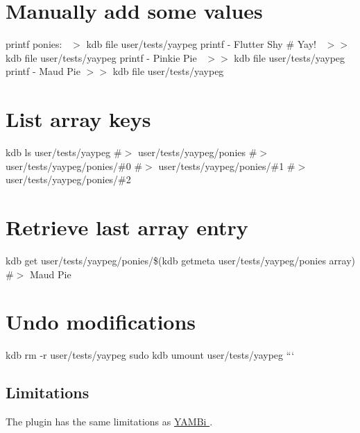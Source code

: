 \section*{Manually add some values}

printf \textquotesingle{}ponies\+:~\newline
\textquotesingle{} $>$ {\ttfamily kdb file user/tests/yaypeg} printf \textquotesingle{} -\/ Flutter Shy \# Yay!~\newline
\textquotesingle{} $>$$>$ {\ttfamily kdb file user/tests/yaypeg} printf \textquotesingle{} -\/ Pinkie Pie~\newline
\textquotesingle{} $>$$>$ {\ttfamily kdb file user/tests/yaypeg} printf \textquotesingle{} -\/ Maud Pie\textquotesingle{} $>$$>$ {\ttfamily kdb file user/tests/yaypeg}

\section*{List array keys}

kdb ls user/tests/yaypeg \#$>$ user/tests/yaypeg/ponies \#$>$ user/tests/yaypeg/ponies/\#0 \#$>$ user/tests/yaypeg/ponies/\#1 \#$>$ user/tests/yaypeg/ponies/\#2

\section*{Retrieve last array entry}

kdb get user/tests/yaypeg/ponies/\$(kdb getmeta user/tests/yaypeg/ponies array) \#$>$ Maud Pie

\section*{Undo modifications}

kdb rm -\/r user/tests/yaypeg sudo kdb umount user/tests/yaypeg ```

\subsection*{Limitations}

The plugin has the same limitations as \hyperlink{md_src_plugins_yambi_README_src_plugins_yambi_README_md}{Y\+A\+M\+Bi }. 